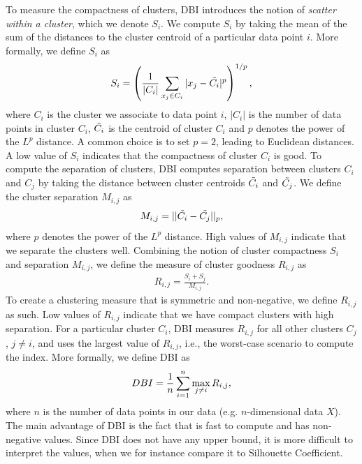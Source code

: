 To measure the compactness of clusters, DBI introduces the notion of \textit{scatter within a cluster}, which we denote $S_i$. We compute $S_i$ by taking the mean of the sum of the distances to the cluster centroid of a particular data point $i$. More formally, we define $S_i$ as
\begin{align}
    S_i = \left( \frac{1}{|C_i|} \sum\limits_{x_j \in C_i}^{} |x_j - \Tilde{C_i}|^p\right)^{1/p},
    \label{eqn:dbi-s}
\end{align}
where $C_i$ is the cluster we associate to data point $i$, $|C_i|$ is the number of data points in cluster $C_i$, $\Tilde{C_i}$ is the centroid of cluster $C_i$ and $p$ denotes the power of the $L^p$ distance. A common choice is to set $p=2$, leading to Euclidean distances. A low value of $S_i$ indicates that the compactness of cluster $C_i$ is good. To compute the separation of clusters, DBI computes separation between clusters $C_i$ and $C_j$ by taking the distance between cluster centroids $\Tilde{C_i}$ and $\Tilde{C_j}$. We define the cluster separation $M_{i, j}$ as
\begin{align}
    M_{i, j} = ||\Tilde{C_i} - \Tilde{C_j}||_p,
    \label{eqn:dbi-m}
\end{align}
where $p$ denotes the power of the $L^p$ distance. High values of $M_{i, j}$ indicate that we separate the clusters well. Combining the notion of cluster compactness $S_i$ and separation $M_{i, j}$, we define the measure of cluster goodness $R_{i, j}$ as
\begin{align}
    R_{i, j} = \frac{S_i + S_j}{M_{i, j}}.
    \label{eqn:dbi-r}
\end{align}
To create a clustering measure that is symmetric and non-negative, we define $R_{i, j}$ as such. Low values of $R_{i, j}$ indicate that we have compact clusters with high separation. For a particular cluster $C_i$, DBI measures $R_{i, j}$ for all other clusters $C_j$, $j \neq i$, and uses the largest value of $R_{i, j}$, i.e., the worst-case scenario to compute the index. More formally, we define DBI as
\begin{align}
    DBI = \frac{1}{n} \sum\limits_{i=1}^{n} \max_{j \neq i} R_{i, j},
    \label{eqn:dbi}
\end{align}
where $n$ is the number of data points in our data (e.g. $n$-dimensional data $X$). The main advantage of DBI is the fact that is fast to compute and has non-negative values. Since DBI does not have any upper bound, it is more difficult to interpret the values, when we for instance compare it to Silhouette Coefficient.

